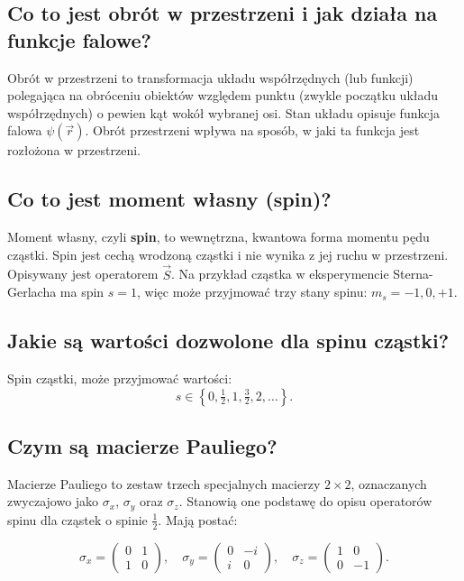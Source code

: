 \subsection{Co to jest obrót w przestrzeni i jak działa na funkcje falowe?}

Obrót w przestrzeni to transformacja układu współrzędnych (lub funkcji) polegająca na obróceniu obiektów względem punktu (zwykle początku układu współrzędnych) o pewien kąt wokół wybranej osi. Stan układu opisuje funkcja falowa $\psi(\vec{r})$. Obrót przestrzeni wpływa na sposób, w jaki ta funkcja jest rozłożona w przestrzeni.

\subsection{Co to jest moment własny (spin)?}

Moment własny, czyli \textbf{spin}, to wewnętrzna, kwantowa forma momentu pędu cząstki. Spin jest cechą wrodzoną cząstki i nie wynika z jej ruchu w przestrzeni. Opisywany jest operatorem $\vec{S}$. Na przykład cząstka w eksperymencie Sterna-Gerlacha ma spin \( s = 1 \), więc może przyjmować trzy stany spinu: \( m_s = -1, 0, +1 \).

\subsection{Jakie są wartości dozwolone dla spinu cząstki?}

Spin cząstki, może przyjmować wartości:
\[
s \in \left\{ 0, \tfrac{1}{2}, 1, \tfrac{3}{2}, 2, \dots \right\}.
\]

\subsection{Czym są macierze Pauliego?}

Macierze Pauliego to zestaw trzech specjalnych macierzy \( 2 \times 2 \), oznaczanych zwyczajowo jako \( \sigma_x \), \( \sigma_y \) oraz \( \sigma_z \). Stanowią one podstawę do opisu operatorów spinu dla cząstek o spinie \( \frac{1}{2} \). Mają postać:

\[
\sigma_x = \begin{pmatrix}
0 & 1 \\
1 & 0
\end{pmatrix}, \quad
\sigma_y = \begin{pmatrix}
0 & -i \\
i & 0
\end{pmatrix}, \quad
\sigma_z = \begin{pmatrix}
1 & 0 \\
0 & -1
\end{pmatrix}.
\]

